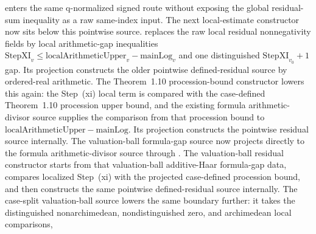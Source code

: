 \begin{proposition}
  enters the same q-normalized signed route without exposing the global
  residual-sum inequality as a raw same-index input.
  The next local-estimate constructor now sits below this pointwise source.
  replaces the raw local residual nonnegativity fields by local arithmetic-gap
  inequalities
  \(\mathrm{StepXI}_v\leq
  \mathrm{localArithmeticUpper}_v-\mathrm{mainLog}_v\) and one distinguished
  \(\mathrm{StepXI}_{v_0}+1\) gap.  Its projection
  constructs the older pointwise defined-residual source by ordered-real
  arithmetic.  The Theorem~1.10 procession-bound constructor
  lowers this again: the Step~(xi) local term is compared with the
  case-defined Theorem~1.10 procession upper bound, and the existing
  formula arithmetic-divisor source supplies the comparison from that
  procession bound to
  \(\mathrm{localArithmeticUpper}-\mathrm{mainLog}\).  Its projection
  constructs the pointwise residual source internally.  The
  valuation-ball formula-gap source now projects directly to the formula
  arithmetic-divisor source through
  .
  The valuation-ball residual constructor
  starts from that valuation-ball additive-Haar formula-gap data, compares
  localized Step~(xi) with the projected case-defined procession bound, and
  then constructs the same pointwise defined-residual source internally.
  The case-split valuation-ball source
  lowers the same boundary further: it takes the distinguished
  nonarchimedean, nondistinguished zero, and archimedean local comparisons,

\end{proposition}
